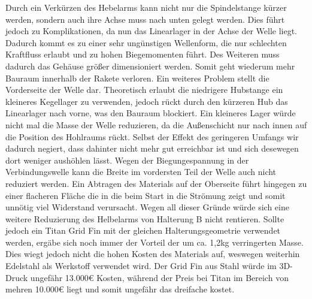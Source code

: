 Durch ein Verkürzen des Hebelarms kann nicht nur die Spindelstange kürzer werden, sondern auch ihre Achse muss nach unten gelegt werden. Dies führt jedoch zu Komplikationen, da nun das Linearlager in der Achse der Welle liegt. Dadurch kommt es zu einer sehr ungünstigen Wellenform, die nur schlechten Kraftfluss erlaubt und zu hohen Biegemomenten führt. Des Weiteren muss dadurch das Gehäuse größer dimensioniert werden. Somit geht wiederum mehr Bauraum innerhalb der Rakete verloren. Ein weiteres Problem stellt die Vorderseite der Welle dar. Theoretisch erlaubt die niedrigere Hubstange ein kleineres Kegellager zu verwenden, jedoch rückt durch den kürzeren Hub das Linearlager nach vorne, was den Bauraum blockiert. Ein kleineres Lager würde nicht mal die Masse der Welle reduzieren, da die Außenschicht nur nach innen auf die Position des Hohlraums rückt. Selbst der Effekt des geringeren Umfangs wir dadurch negiert, dass dahinter nicht mehr gut erreichbar ist und sich desewegen dort weniger aushöhlen lässt. Wegen der Biegungespannung in der Verbindungswelle kann die Breite im vordersten Teil der Welle auch nicht reduziert werden. Ein Abtragen des Materials auf der Oberseite führt hingegen zu einer flacheren Fläche die in die beim Start in die Strömung zeigt und somit unnötig viel Widerstand verursacht. Wegen all dieser Gründe würde sich eine weitere Reduzierung des Helbelarms von Halterung B nicht rentieren. Sollte jedoch ein Titan Grid Fin mit der gleichen Halterungsgeometrie verwendet werden, ergäbe sich noch immer der Vorteil der um ca. 1,2kg verringerten Masse. Dies wiegt jedoch nicht die hohen Kosten des Materials auf, weswegen weiterhin Edelstahl als Werkstoff verwendet wird. Der Grid Fin aus Stahl würde im 3D-Druck ungefähr 13.000€ Kosten, während der Preis bei Titan im Bereich von mehren 10.000€ liegt und somit ungefähr das dreifache kostet.
